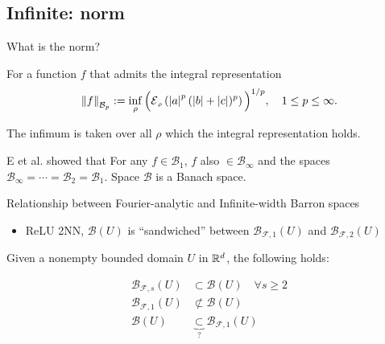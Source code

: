 \documentclass[aspectratio=32]{beamer}
\newcommand*{\barronnorm}[2]{\norm{{#1}}_{\mathcal{B}_{#2}}}
\begin{document}
\subsection{Infinite: norm}
\begin{frame}{What is the norm?}
    \begin{definition} For a function $f$ that admits the integral
        representation
        \begin{equation}\label{eq:barron_norm}
            \barronnorm{f}{p} := \inf_{\rho} \Big(\ERWi{\rho}{\abs{a}^p 
            (\abs{b} + \abs{c})^p}\Big)^{1/p},
            \quad 1 \leq p \leq \infty.
        \end{equation}
    \end{definition}

    The infimum is taken over all $\rho$ which the integral representation holds.

    \vspace*{1em}

    E et al. showed that For any $f \in \mathcal{B}_1$, $f$ also $\in \mathcal{B}_{\infty}$ and the spaces $\mathcal{B}_{\infty} = \cdots = \mathcal{B}_{2} = \mathcal{B}_{1}$. Space $\mathcal{B}$ is a Banach space.
    
\end{frame}

\begin{frame}{Relationship between Fourier-analytic and Infinite-width Barron spaces}

    \begin{itemize}
        \item ReLU 2NN, $\mathcal{B}(U)$ is ``sandwiched'' between
              $\mathcal{B}_{\mathcal{F},1}(U)$ and $\mathcal{B}_{\mathcal{F},2}(U)$
    \end{itemize}

    Given a nonempty bounded domain $U$ in $\mathbb{R}^d$, the following holds:

    \begin{align*}
        \mathcal{B}_{\mathcal{F},s}(U) &\subset \mathcal{B}(U) \quad \forall s \geq 2 \\
        \mathcal{B}_{\mathcal{F},1}(U) &\not\subset \mathcal{B}(U) \\
        \mathcal{B}(U) &\underbrace{\subset}_{\text{?}} \mathcal{B}_{\mathcal{F},1}(U) \\
    \end{align*}

\end{frame}
\end{document}
